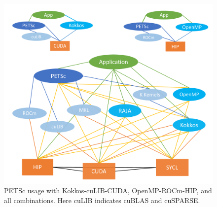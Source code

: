 \documentclass[5p,times]{elsarticle}
\begin{document}

\begin{figure}[htbp]
\begin{center}
\includegraphics[clip,width=.99\linewidth]{PETSc-backends-all.pdf}
\caption{PETSc usage with Kokkos-cuLIB-CUDA, OpenMP-ROCm-HIP, and all combinations. Here cuLIB indicates cuBLAS and cuSPARSE.}
\label{fig:petsc_backends}
\end{center}
\end{figure}
\end{document}

